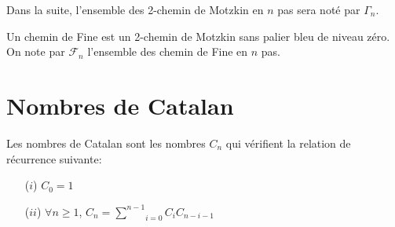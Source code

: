 Dans la suite, l'ensemble des 2-chemin de Motzkin en $n$ pas sera noté par $\Gamma_{n}$.
\vspace{5pt}
\begin{definition}
	\begin{rm}
		Un chemin de Fine est un 2-chemin de Motzkin sans palier bleu de niveau zéro. On note par $\mathcal{F}_{n}$ l'ensemble des chemin de Fine en $n$ pas.
	\end{rm}
\end{definition}

\section{Nombres de Catalan}
\begin{definition}
	\begin{rm}
		Les nombres de Catalan sont les nombres $C_{n}$ qui vérifient la relation de récurrence suivante:
		\begin{itemize}
			\item [($i$)] $C_{0}=1$
			\item [($ii$)] $\forall n \geq 1$, $C_{n} = \underset{i=0}{\overset{n-1}{\sum}}C_{i}C_{n-i-1}$
		\end{itemize}
	\end{rm}
\end{definition}


